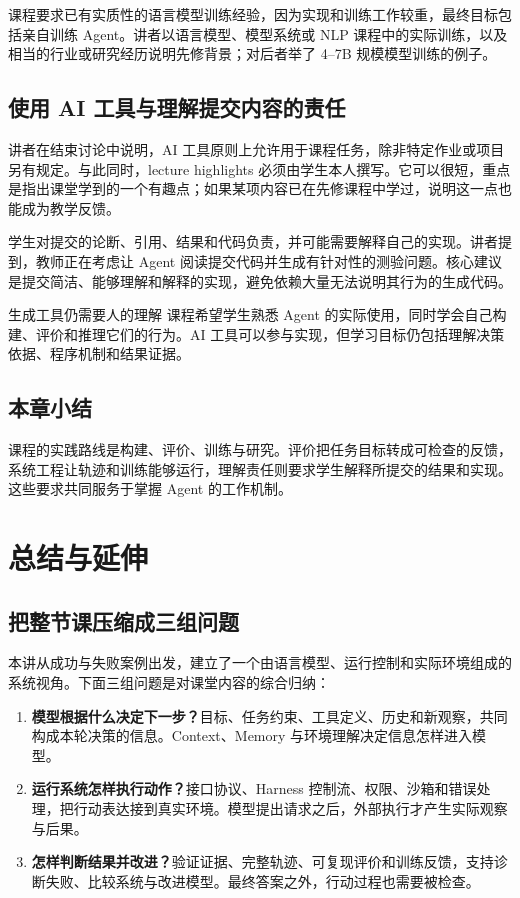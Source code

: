 \documentclass[11pt,a4paper]{article}
\begin{document}
课程要求已有实质性的语言模型训练经验，因为实现和训练工作较重，最终目标包括亲自训练 Agent。讲者以语言模型、模型系统或 NLP 课程中的实际训练，以及相当的行业或研究经历说明先修背景；对后者举了 4--7B 规模模型训练的例子。

\subsection{使用 AI 工具与理解提交内容的责任}
讲者在结束讨论中说明，AI 工具原则上允许用于课程任务，除非特定作业或项目另有规定。与此同时，lecture highlights 必须由学生本人撰写。它可以很短，重点是指出课堂学到的一个有趣点；如果某项内容已在先修课程中学过，说明这一点也能成为教学反馈。

学生对提交的论断、引用、结果和代码负责，并可能需要解释自己的实现。讲者提到，教师正在考虑让 Agent 阅读提交代码并生成有针对性的测验问题。核心建议是提交简洁、能够理解和解释的实现，避免依赖大量无法说明其行为的生成代码。

\begin{importantbox}{生成工具仍需要人的理解}
课程希望学生熟悉 Agent 的实际使用，同时学会自己构建、评价和推理它们的行为。AI 工具可以参与实现，但学习目标仍包括理解决策依据、程序机制和结果证据。
\end{importantbox}

\subsection{本章小结}
课程的实践路线是构建、评价、训练与研究。评价把任务目标转成可检查的反馈，系统工程让轨迹和训练能够运行，理解责任则要求学生解释所提交的结果和实现。这些要求共同服务于掌握 Agent 的工作机制。

\clearpage
\section{总结与延伸}
\subsection{把整节课压缩成三组问题}
本讲从成功与失败案例出发，建立了一个由语言模型、运行控制和实际环境组成的系统视角。下面三组问题是对课堂内容的综合归纳：
\begin{enumerate}
\item \textbf{模型根据什么决定下一步？}目标、任务约束、工具定义、历史和新观察，共同构成本轮决策的信息。Context、Memory 与环境理解决定信息怎样进入模型。
\item \textbf{运行系统怎样执行动作？}接口协议、Harness 控制流、权限、沙箱和错误处理，把行动表达接到真实环境。模型提出请求之后，外部执行才产生实际观察与后果。
\item \textbf{怎样判断结果并改进？}验证证据、完整轨迹、可复现评价和训练反馈，支持诊断失败、比较系统与改进模型。最终答案之外，行动过程也需要被检查。
\end{enumerate}
\end{document}
